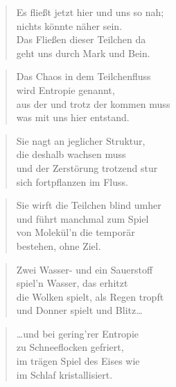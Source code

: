 \documentclass[10pt,a4paper]{article}
\begin{document}
\begin{paracol}{2}
\begin{verse}
Es fließt jetzt hier und uns so nah; \\
nichts könnte näher sein. \\
Das Fließen dieser Teilchen da \\
geht uns durch Mark und Bein. \\
\end{verse}

\begin{verse}
Das Chaos in dem Teilchenfluss \\
wird Entropie genannt, \\
aus der und trotz der kommen muss \\
was mit uns hier entstand. \\
\end{verse}

\begin{verse}
Sie nagt an jeglicher Struktur, \\
die deshalb wachsen muss \\
und der Zerstörung trotzend stur \\
sich fortpflanzen im Fluss. \\
\end{verse}

\begin{verse}
Sie wirft die Teilchen blind umher \\
und führt manchmal zum Spiel \\
von Molekül’n die temporär \\
bestehen, ohne Ziel. \\
\end{verse}

\begin{verse}
Zwei Wasser- und ein Sauerstoff \\
spiel’n Wasser, das erhitzt \\
die Wolken spielt, als Regen tropft \\
und Donner spielt und Blitz… \\
\end{verse}

\begin{verse}
…und bei gering’rer Entropie \\
zu Schneeflocken gefriert, \\
im trägen Spiel des Eises wie \\
im Schlaf kristallisiert. \\
\end{verse}


\end{paracol}
\end{document}
